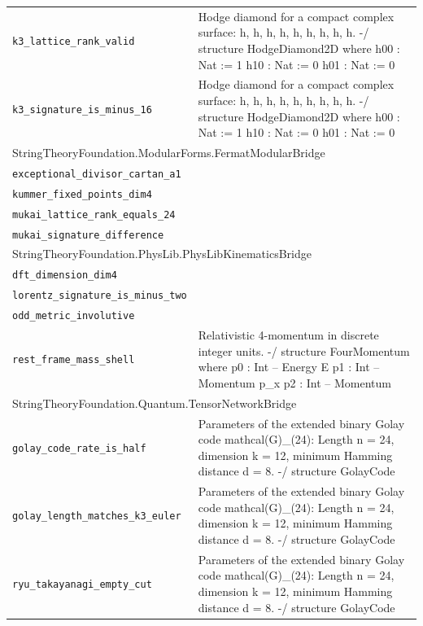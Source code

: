\begin{longtable}{p{}p{}}
\quad\texttt{\footnotesize k3\_lattice\_rank\_valid} & {\footnotesize Hodge diamond for a compact complex surface: h, h, h, h, h, h, h, h, h. -/ structure HodgeDiamond2D where h00 : Nat := 1 h10 : Nat := 0 h01 : Nat := 0} \\
\quad\texttt{\footnotesize k3\_signature\_is\_minus\_16} & {\footnotesize Hodge diamond for a compact complex surface: h, h, h, h, h, h, h, h, h. -/ structure HodgeDiamond2D where h00 : Nat := 1 h10 : Nat := 0 h01 : Nat := 0} \\
\multicolumn{2}{l}{\textsf{\small StringTheoryFoundation.ModularForms.FermatModularBridge}} \\
\quad\texttt{\footnotesize exceptional\_divisor\_cartan\_a1} & {\footnotesize } \\
\quad\texttt{\footnotesize kummer\_fixed\_points\_dim4} & {\footnotesize } \\
\quad\texttt{\footnotesize mukai\_lattice\_rank\_equals\_24} & {\footnotesize } \\
\quad\texttt{\footnotesize mukai\_signature\_difference} & {\footnotesize } \\
\multicolumn{2}{l}{\textsf{\small StringTheoryFoundation.PhysLib.PhysLibKinematicsBridge}} \\
\quad\texttt{\footnotesize dft\_dimension\_dim4} & {\footnotesize } \\
\quad\texttt{\footnotesize lorentz\_signature\_is\_minus\_two} & {\footnotesize } \\
\quad\texttt{\footnotesize odd\_metric\_involutive} & {\footnotesize } \\
\quad\texttt{\footnotesize rest\_frame\_mass\_shell} & {\footnotesize Relativistic 4-momentum in discrete integer units. -/ structure FourMomentum where p0 : Int -- Energy E p1 : Int -- Momentum p\_x p2 : Int -- Momentum } \\
\multicolumn{2}{l}{\textsf{\small StringTheoryFoundation.Quantum.TensorNetworkBridge}} \\
\quad\texttt{\footnotesize golay\_code\_rate\_is\_half} & {\footnotesize Parameters of the extended binary Golay code  mathcal(G)\_(24): Length n = 24, dimension k = 12, minimum Hamming distance d = 8. -/ structure GolayCode} \\
\quad\texttt{\footnotesize golay\_length\_matches\_k3\_euler} & {\footnotesize Parameters of the extended binary Golay code  mathcal(G)\_(24): Length n = 24, dimension k = 12, minimum Hamming distance d = 8. -/ structure GolayCode} \\
\quad\texttt{\footnotesize ryu\_takayanagi\_empty\_cut} & {\footnotesize Parameters of the extended binary Golay code  mathcal(G)\_(24): Length n = 24, dimension k = 12, minimum Hamming distance d = 8. -/ structure GolayCode} \\

\end{longtable}
